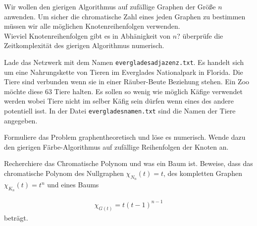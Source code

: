 		
		\subexercise[%
  topic=Zeitkomplexit\"at des gierigen F\"arbe-Algorithmus,
    ]

Wir wollen den gierigen Algorithmus auf zuf\"allige Graphen der Gr\"o\ss e $n$ anwenden. Um sicher die chromatische Zahl eines jeden Graphen zu bestimmen m\"ussen wir alle m\"oglichen Knotenreihenfolgen verwenden.\\
Wieviel Knotenreihenfolgen gibt es in Abh\"anigkeit von $n$? \"uberpr\"ufe die Zeitkomplexit\"at des gierigen Algorithmus numerisch.
		
\exercise[%
  topic=K\"afighaltung von Tieren,
    ]

Lade das Netzwerk mit dem Namen {\tt everglades\textunderscore adjazenz.txt}. Es handelt sich um eine Nahrungskette von Tieren im Everglades Nationalpark in Florida. Die Tiere sind verbunden wenn sie in einer R\"auber-Beute Beziehung stehen. Ein Zoo m\"ochte diese $63$ Tiere halten. Es sollen so wenig wie m\"oglich K\"afige verwendet werden wobei Tiere nicht im selber K\"afig sein d\"urfen wenn eines des andere potentiell isst. In der Datei {\tt everglades\textunderscore namen.txt} sind die Namen der Tiere angegeben.


Formuliere das Problem graphentheoretisch und l\"ose es numerisch. Wende dazu den gierigen F\"arbe-Algorithmus auf zuf\"allige Reihenfolgen der Knoten an. 

\exercise[%
  topic=Chromatisches Polynom,
    ]

Recherchiere das Chromatische Polynom und was ein Baum ist. Beweise, dass das chromatische Polynom des Nullgraphen $\chi_{N_n}(t) =t$, des kompletten Graphen $\chi_{K_n}(t) =t^n$ und eines Baums 

\begin{align}
\chi_{G(t)} = t(t-1)^{n-1}
\end{align}
betr\"agt.

 


	

